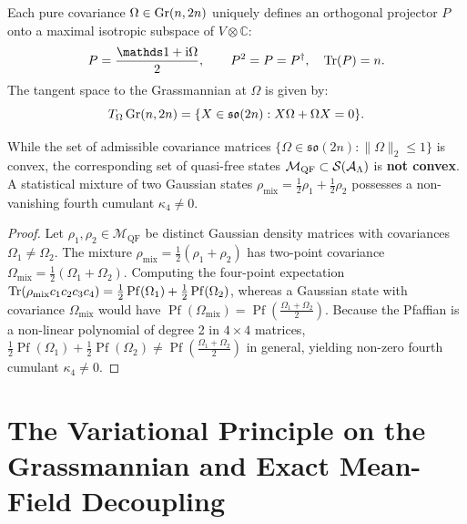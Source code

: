 Each pure covariance $\Omega \in \operatorname{Gr}(n, 2n)$ uniquely defines an orthogonal projector $P$ onto a maximal isotropic subspace of $V \otimes \mathbb{C}$:
\begin{equation}
\label{eq:m1_1b_projector_covariance}
P = \frac{\Id + \ii \Omega}{2}, \qquad P^2 = P = P^\dagger, \quad \Tr(P) = n.
\end{equation}
The tangent space to the Grassmannian at $\Omega$ is given by:
\begin{equation}
\label{eq:m1_1b_tangent_space}
T_\Omega \operatorname{Gr}(n, 2n) = \{ X \in \mathfrak{so}(2n) : X \Omega + \Omega X = 0 \}.
\end{equation}

\begin{proposition}
\label{prop:m1_1b_non_convexity}
While the set of admissible covariance matrices $\{\Omega \in \mathfrak{so}(2n) : \|\Omega\|_2 \le 1\}$ is convex, the corresponding set of quasi-free states $\mathcal{M}_{\mathrm{QF}} \subset \mathcal{S}(\mathcal{A}_{\Lambda})$ is \textbf{not convex}. A statistical mixture of two Gaussian states $\rho_{\mathrm{mix}} = \frac{1}{2}\rho_1 + \frac{1}{2}\rho_2$ possesses a non-vanishing fourth cumulant $\kappa_4 \ne 0$.
\end{proposition}
\begin{proof}
Let $\rho_1, \rho_2 \in \mathcal{M}_{\mathrm{QF}}$ be distinct Gaussian density matrices with covariances $\Omega_1 \neq \Omega_2$. The mixture $\rho_{\mathrm{mix}} = \frac{1}{2}(\rho_1 + \rho_2)$ has two-point covariance $\Omega_{\mathrm{mix}} = \frac{1}{2}(\Omega_1 + \Omega_2)$. Computing the four-point expectation $\operatorname{Tr}(\rho_{\mathrm{mix}} c_1 c_2 c_3 c_4) = \frac{1}{2}\operatorname{Pf}(\Omega_1) + \frac{1}{2}\operatorname{Pf}(\Omega_2)$, whereas a Gaussian state with covariance $\Omega_{\mathrm{mix}}$ would have $\operatorname{Pf}(\Omega_{\mathrm{mix}}) = \operatorname{Pf}\left(\frac{\Omega_1 + \Omega_2}{2}\right)$. Because the Pfaffian is a non-linear polynomial of degree 2 in $4 \times 4$ matrices, $\frac{1}{2}\operatorname{Pf}(\Omega_1) + \frac{1}{2}\operatorname{Pf}(\Omega_2) \neq \operatorname{Pf}\left(\frac{\Omega_1 + \Omega_2}{2}\right)$ in general, yielding non-zero fourth cumulant $\kappa_4 \ne 0$.
\end{proof}



\section{The Variational Principle on the Grassmannian and Exact Mean-Field Decoupling}
\label{sec:m1_1b_variational_principle}

